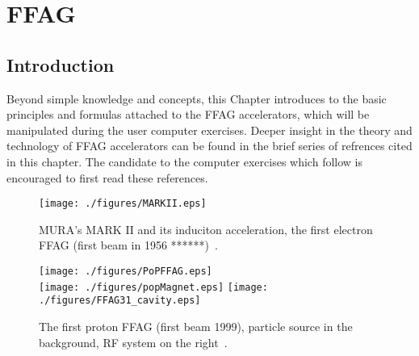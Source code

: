 

\newcommand{\Br}{\ensuremath{B\!\rho}}
\newcommand{\bull}{\ensuremath{\bullet~}}
\newcommand{\Bz}{\ensuremath{{B_z}}}
\newcommand{\com}{\ensuremath{\it com}}
\newcommand{\dip}{{\it DIPOLE}}
\newcommand{\EFB}{\ensuremath{E\!F\!B}}
\newcommand{\EFBs}{\ensuremath{E\!F\!B\!s}}
\newcommand{\ffag}{{\it FFAG}}
\newcommand{\lab}{\ensuremath{lab}}
\newcommand{\MC}{Monte~Carlo}


\chapter[FFAG]{FFAG}\label{chapFFAG}


\section{Introduction}\label{secCycloIntro}


Beyond simple knowledge and concepts, this Chapter introduces to the basic principles and formulas attached 
to the FFAG accelerators, 
which will be manipulated during the user computer exercises. 
Deeper insight in the theory and technology 
of  FFAG accelerators  
can be found in the brief series of refrences cited in this chapter. 
The candidate to the computer exercises which follow is encouraged to first read these references. 

\begin{figure}[ht]
\sidebyside
{
  \begin{minipage}{.47\linewidth}
    \texttt{[image: ./figures/MARKII.eps]}
    \caption{
    MURA's MARK II and its induciton acceleration, the 
 first electron FFAG (first beam in 1956 ******)~\cite{BibFFAG-1}.
    } 
    \label{figFFAG_MARKII}
   \end{minipage}
}{
  \begin{minipage}{.45\linewidth}
    \texttt{[image: ./figures/PoPFFAG.eps]}\\
    \texttt{[image: ./figures/popMagnet.eps]}
    \texttt{[image: ./figures/FFAG31\_cavity.eps]}
    \caption{
    The first proton FFAG (first beam 1999), particle source 
 in the background, RF system on the right~\cite{BibFFAG-2}. 
    }
    \label{figFFAG_POP}
   \end{minipage}
}
\end{figure}

